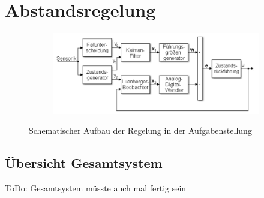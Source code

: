 \chapter{Abstandsregelung}\label{chp:Abstandsregelung}
\begin{figure}[hbt]
\centering
\begin{subfigure}{0.69\textwidth}
    \centering
    \includegraphics*[width=\textwidth]{figures/abstand_aufgabenstelllung.png}
\end{subfigure}
    \caption{Schematischer Aufbau der Regelung in der Aufgabenstellung
    \label{fig:abstand_as}}
\end{figure}    

\section{Übersicht Gesamtsystem}\label{sec:Übersicht Gesamtsystem}
ToDo: Gesamtsystem müsste auch mal fertig sein

